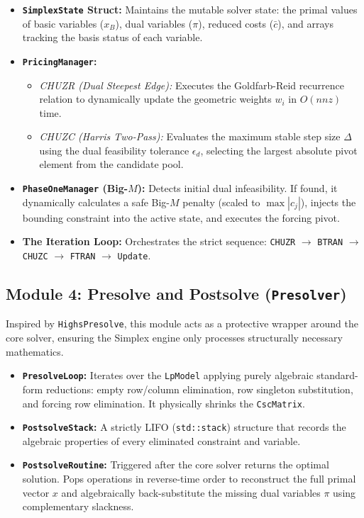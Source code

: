 \documentclass[11pt, a4paper]{article}
\begin{document}
\begin{itemize}[itemsep=4pt, leftmargin=*]
    \item \textbf{\texttt{SimplexState} Struct:} Maintains the mutable solver state: the primal values of basic variables ($x_B$), dual variables ($\pi$), reduced costs ($\bar{c}$), and arrays tracking the basis status of each variable.
    \item \textbf{\texttt{PricingManager}:} 
        \begin{itemize}[itemsep=1pt]
            \item \emph{CHUZR (Dual Steepest Edge):} Executes the Goldfarb-Reid recurrence relation to dynamically update the geometric weights $w_i$ in $O(nnz)$ time.
            \item \emph{CHUZC (Harris Two-Pass):} Evaluates the maximum stable step size $\Delta$ using the dual feasibility tolerance $\epsilon_d$, selecting the largest absolute pivot element from the candidate pool.
        \end{itemize}
    \item \textbf{\texttt{PhaseOneManager} (Big-$M$):} Detects initial dual infeasibility. If found, it dynamically calculates a safe Big-$M$ penalty (scaled to $\max|c_j|$), injects the bounding constraint into the active state, and executes the forcing pivot.
    \item \textbf{The Iteration Loop:} Orchestrates the strict sequence: \texttt{CHUZR} $\to$ \texttt{BTRAN} $\to$ \texttt{CHUZC} $\to$ \texttt{FTRAN} $\to$ \texttt{Update}.
\end{itemize}

\subsection{Module 4: Presolve and Postsolve (\texttt{Presolver})}

Inspired by \texttt{HighsPresolve}, this module acts as a protective wrapper around the core solver, ensuring the Simplex engine only processes structurally necessary mathematics.

\begin{itemize}[itemsep=4pt, leftmargin=*]
    \item \textbf{\texttt{PresolveLoop}:} Iterates over the \texttt{LpModel} applying purely algebraic standard-form reductions: empty row/column elimination, row singleton substitution, and forcing row elimination. It physically shrinks the \texttt{CscMatrix}.
    \item \textbf{\texttt{PostsolveStack}:} A strictly LIFO (\texttt{std::stack}) structure that records the algebraic properties of every eliminated constraint and variable.
    \item \textbf{\texttt{PostsolveRoutine}:} Triggered after the core solver returns the optimal solution. Pops operations in reverse-time order to reconstruct the full primal vector $x$ and algebraically back-substitute the missing dual variables $\pi$ using complementary slackness.
\end{itemize}
\end{document}
